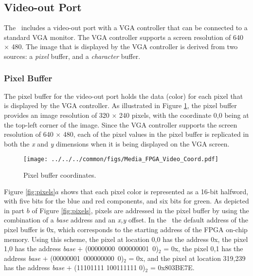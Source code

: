 \subsection{Video-out Port}
\label{sec:video_out}

The \systemName~includes a video-out port with a VGA controller that can be
connected to a standard VGA monitor. The VGA controller supports a screen resolution of
640 $\times$ 480. The image that is displayed by the VGA controller is
derived from two sources: a {\it pixel} buffer, and a {\it character} buffer.

\subsubsection{Pixel Buffer}
\label{sec:pixel_buffer}

The pixel buffer for the video-out port holds the data (color) for each pixel that is 
displayed by the VGA controller.  As illustrated in Figure \ref{fig:video_coord}, the
pixel buffer provides an image resolution of 
320 $\times$ 240 pixels, with the coordinate 0,0 being at the top-left corner of the image. 
Since the VGA controller supports the screen resolution of 640 $\times$ 480, each of the
pixel values in
the pixel buffer is replicated in both the {\it x} and {\it y} dimensions when it is being
displayed on the VGA screen.

\begin{figure}[h!]
   \begin{center}
       \texttt{[image: ../../../common/figs/Media\_FPGA\_Video\_Coord.pdf]}
   \end{center}
   \caption{Pixel buffer coordinates.}
	\label{fig:video_coord}
\end{figure}

Figure \ref{fig:pixels}$a$ shows that each pixel color is represented as a 16-bit halfword, 
with five bits for the blue and red 
components, and six bits for green.  As depicted in part $b$ of Figure \ref{fig:pixels}, 
pixels are addressed in the pixel buffer by 
using the combination of a {\it base} address and an {\it x,y} offset.  In the \systemName~the default address of the pixel buffer is {\sf 0x}, which corresponds
to the starting address of the FPGA on-chip memory.  Using this scheme, the pixel at 
location 0,0 has the address {\sf 0x}, 
the pixel 1,0 has the address {\it base} $+$ (00000000~000000001~0)$_2$ = {\sf 0x}, 
the pixel 0,1 has the address {\it base} $+$ (00000001~000000000~0)$_2$ = {\sf 0x}, and 
the pixel at location 319,239 has the address {\it base} $+$ (11101111 100111111 0)$_2$ = 
{\sf 0x\baseAddressOffset 803BE7E}. 

